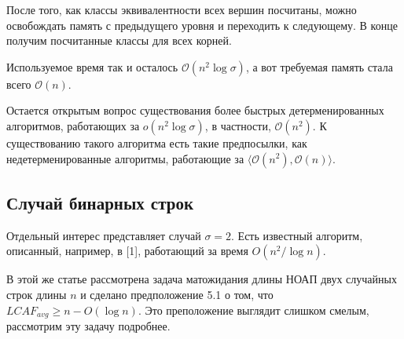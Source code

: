 После того, как классы эквивалентности всех вершин посчитаны, можно освобождать память с предыдущего уровня и переходить к следующему. В конце получим посчитанные классы для всех корней.

Используемое время так и осталось $\mathcal{O}(n^2 \log \sigma)$, а вот требуемая память стала всего $\mathcal{O}(n)$.

Остается открытым вопрос существования более быстрых детерменированных алгоритмов, работающих за $o(n^2 \log \sigma)$, в частности, $\mathcal{O}(n^2)$. К существованию такого алгоритма есть такие предпосылки, как недетерменированные алгоритмы, работающие за $\langle \mathcal{O}(n^2), \mathcal{O}(n) \rangle$.

\subsection{Случай бинарных строк}
Отдельный интерес представляет случай $\sigma=2$. Есть известный алгоритм, описанный, например, в [1], работающий за время $O(n^2/\log n)$.

В этой же статье рассмотрена задача матожидания длины НОАП двух случайных строк длины $n$ и сделано предположение 5.1 о том, что $LCAF_{avg} \ge n - O(\log n)$. Это преположение выглядит слишком смелым, рассмотрим эту задачу подробнее.


